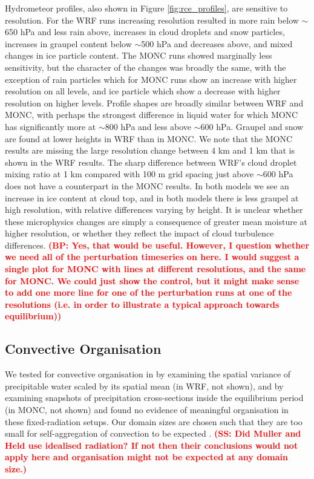 \documentclass[draft]{agujournal2019}
\newcommand{\todo}[1]{\textcolor{red}{\textbf{(#1)}}}
\begin{document}
Hydrometeor profiles, also shown in Figure \ref{fig:rce_profiles}, are sensitive
to resolution. For the WRF runs increasing resolution resulted in more rain
below $\sim$650 hPa and less rain above, increases in cloud droplets and snow
particles, increases in graupel content below $\sim$500 hPa and decreases above,
and mixed changes in ice particle content. The MONC runs showed marginally less
sensitivity, but the character of the changes was broadly the same, with the
exception of rain particles which for MONC runs show an increase with higher
resolution on all levels, and ice particle which show a decrease with higher
resolution on higher levels. Profile shapes are broadly similar between WRF and
MONC, with perhaps the strongest difference in liquid water for which MONC has
significantly more at $\sim$800 hPa and less above $\sim$600 hPa. Graupel and
snow are found at lower heights in WRF than in MONC. We note that the MONC
results are missing the large resolution change between 4 km and 1 km that is
shown in the WRF results. The sharp difference between WRF's cloud droplet
mixing ratio at 1 km compared with 100 m grid spacing just above $\sim$600 hPa
does not have a counterpart in the MONC results. In both models we see an
increase in ice content at cloud top, and in both models there is less graupel
at high resolution, with relative differences varying by height. It is unclear whether these microphysics changes are simply a consequence of greater mean moisture at higher resolution, or whether they reflect the impact of cloud turbulence differences. \todo{BP: Yes, that would be useful. However, I question whether we need all of the perturbation timeseries on here. I would suggest a single plot for MONC with lines at different resolutions, and the same for MONC. We could just show the control, but it might make sense to add one more line for one of the perturbation runs at one of the resolutions (i.e. in order to illustrate a typical approach towards equilibrium)}

\subsection{Convective Organisation}

We tested for convective organisation in by examining the spatial variance of
precipitable water scaled by its spatial mean (in WRF, not shown), and by
examining snapshots of precipitation cross-sections inside the equilibrium
period (in MONC, not shown) and found no evidence of meaningful organisation in
these fixed-radiation setups. Our domain sizes are chosen such that they are
too small for self-aggregation of convection to be expected
\cite{Muller_JAS_2012}. \todo{SS: Did Muller and Held use idealised radiation?  If not then their conclusions would not apply here and organisation might not be expected at any domain size.}
\end{document}
